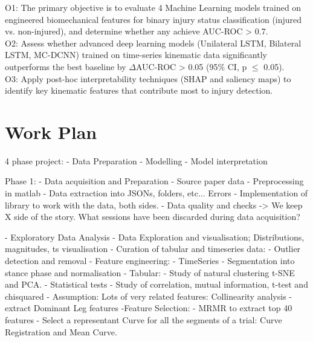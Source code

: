 
O1: The primary objective is to evaluate 4 Machine Learning models trained on engineered biomechanical features for binary injury status classification (injured vs. non-injured), and determine whether any achieve AUC-ROC > 0.7.\\

O2: Assess whether advanced deep learning models (Unilateral LSTM, Bilateral LSTM, MC-DCNN) trained on time-series kinematic data significantly outperforms the best baseline by $\Delta$AUC-ROC > 0.05 (95\% CI, p $\le$ 0.05).\\

O3: Apply post-hoc interpretability techniques (SHAP and saliency maps) to identify key kinematic features that contribute most to injury detection.

\section{Work Plan}\label{sec:intro-work-plan}

4 phase project:
    - Data Preparation
    - Modelling
    - Model interpretation

Phase 1:
- Data acquisition and Preparation
    - Source paper data
    - Preprocessing in matlab
    - Data extraction into JSONs, folders, etc... Errors
    - Implementation of library to work with the data, both sides.
    - Data quality and checks -> We keep X side of the story. What sessions have been discarded during data acquisition?

- Exploratory Data Analysis
    - Data Exploration and visualisation; Distributions, magnitudes, ts visualisation
    - Curation of tabular and timeseries data:
        - Outlier detection and removal
    - Feature engineering:
        - TimeSeries
            - Segmentation into stance phase and normalisation
        - Tabular:
            - Study of natural clustering t-SNE and PCA.
            - Statistical tests - Study of correlation, mutual information, t-test and chisquared
            - Assumption: Lots of very related features: Collinearity analysis
            - extract Dominant Leg features
    -Feature Selection:
        - MRMR to extract top 40 features
        - Select a representant Curve for all the segments of a trial: Curve Registration and Mean Curve.

